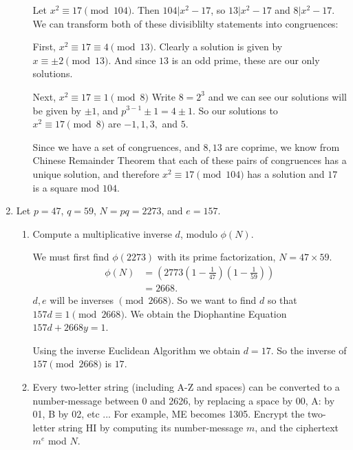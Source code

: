 \documentclass{article}
\begin{document}
\begin{enumerate}
\begin{enumerate}[label= (\alph*)]
        Let $x^2\equiv 17\pmod{104}$. Then $104|x^2-17$, so $13|x^2-17$ and $8|x^2-17$. We can 
        transform both of these divisiblilty statements into congruences:
    
        First, $x^2\equiv 17\equiv 4\pmod{13}$. Clearly a solution is given by 
        $x\equiv \pm 2\pmod{13}$. And since $13$ is an odd prime, these are our only solutions.

        Next, $x^2\equiv 17\equiv 1\pmod{8}$ Write $8=2^3$ and we can see our solutions will be given
        by $\pm 1$, and $p^{3-1}\pm1=4\pm 1$. So our solutions to $x^2\equiv 17\pmod{8}$ are $-1,1,3,$
        and $5$.

        Since we have a set of congruences, and $8,13$ are coprime, we know from Chinese Remainder 
        Theorem that each of these pairs of congruences has a unique solution, and therefore 
        $x^2\equiv 17\pmod{104}$ has a solution and $17$ is a square mod $104$.
    \end{enumerate}

\item Let $p=47$, $q=59$, $N=pq=2273$, and $e=157$.
    \begin{enumerate}[label= (\alph*)] 
        \item Compute a multiplicative inverse $d$, modulo $\phi(N)$.

            We must first find $\phi(2273)$ with its prime factorization, $N=47\times 59$.
            \begin{align*}
            \phi(N)&=\left( 2773\left( 1-\frac{1}{47} \right) \left( 1-\frac{1}{59} \right)  \right) \\
            &= 2668 
            .\end{align*}
            $d,e$ will be inverses $\pmod{2668}$.
            So we want to find $d$ so that $157d\equiv 1\pmod{2668}$. We obtain the Diophantine 
            Equation $157d+2668y=1$.

            Using the inverse Euclidean Algorithm we obtain $d=17$. So the inverse of $157\pmod{2668}$
            is $17$.
            
        \item Every two-letter string (including A-Z and spaces)
            can be converted to a number-message between 0 and 2626, by replacing
            a space by 00, A: by 01, B by 02, etc ... For example, 
            ME becomes 1305. Encrypt the two-letter string HI by computing its
            number-message $m$, and the ciphertext $m^{e}$ mod $N$.


\end{enumerate}
\end{enumerate}
\end{document}
